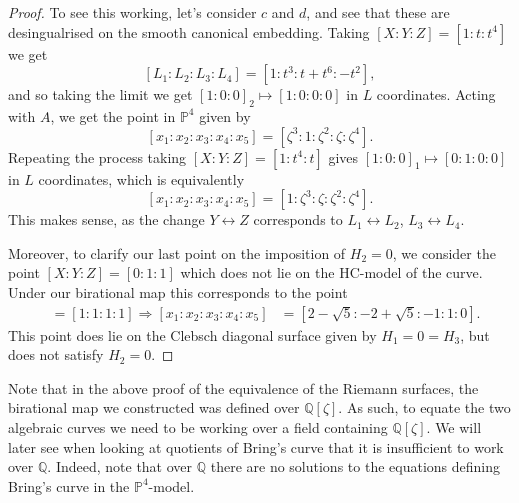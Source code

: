 \documentclass{amsart}
\begin{document}
\begin{proof}
To see this working, let's consider $c$ and $d$, and see that these are desingualrised on the smooth canonical embedding. Taking $[X:Y:Z] = [1:t:t^4]$ we get 
\[
[L_1: L_2: L_3: L_4] = [1: t^3 :t+ t^6 : -t^2]  ,
\]
and so taking the limit we get $[1:0:0]_2 \mapsto [1:0:0:0]$ in $L$ coordinates. Acting with $A$, we get the point in $\mathbb{P}^4$ given by 
\[
[x_1 : x_2 : x_3 : x_4 : x_5] = [\zeta^3 : 1 : \zeta^2 : \zeta : \zeta^4]  . 
\]
Repeating the process taking $[X:Y:Z] = [1:t^4:t]$ gives $[1:0:0]_1 \mapsto [0:1:0:0]$ in $L$ coordinates, which is equivalently 
\[
[x_1 : x_2 : x_3 : x_4 : x_5] = [1 : \zeta^3 : \zeta : \zeta^2 : \zeta^4]  . 
\]
This makes sense, as the change $Y \leftrightarrow Z$ corresponds to $L_1 \leftrightarrow L_2$, $L_3 \leftrightarrow L_4$. 

Moreover, to clarify our last point on the imposition of $H_2=0$, we consider the point $[X:Y:Z] = [0:1:1]$ which does not lie on the HC-model of the curve. Under our birational map this corresponds to the point 
\begin{align*}
    [L_1 : L_2 : L_3 : L_4] &= [1:  1 :1 :1]  
    \Rightarrow [x_1 : x_2 : x_3 : x_4 : x_5] &=  [2-\sqrt{5} : -2+\sqrt{5} : -1 : 1 : 0]  .
\end{align*}
This point does lie on the Clebsch diagonal surface given by $H_1 = 0 = H_3$, but does not satisfy $H_2=0$. 
\end{proof}

Note that in the above proof of the equivalence of the Riemann surfaces, the birational map we constructed was defined over $\mathbb{Q}[\zeta]$. As such, to equate the two algebraic curves we need to be working over a field containing $\mathbb{Q}[\zeta]$. We will later see when looking at quotients of Bring's curve that it is insufficient to work over $\mathbb{Q}$. Indeed, note that over $\mathbb{Q}$ there are no solutions to the equations defining Bring's curve in the $\mathbb{P}^4$-model.  
\end{document}
